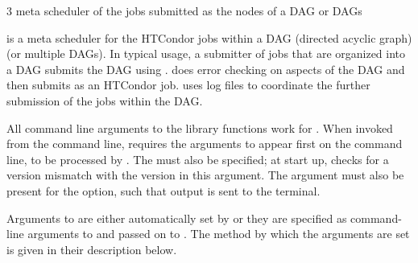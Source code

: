 \begin{ManPage}{\label{man-condor-dagman}}{3}
{meta scheduler of the jobs submitted as the nodes of a DAG or DAGs}
\Synopsis 
{}




\Description
{} is a meta scheduler for the HTCondor jobs within
a DAG (directed acyclic graph) (or multiple DAGs).
In typical usage,
a submitter of jobs that are organized into a DAG submits the
DAG using .
 does error checking on aspects of the DAG
and then submits  as an HTCondor job.
 uses log files to coordinate the further 
submission of the jobs within the DAG.

All command line arguments to the  library functions
work for .
When invoked from the command line,  requires
the arguments  to appear first on the command line,
to be processed by .
The  must also be specified;
at start up,
 checks for a version mismatch with the
 version in this argument.
The  argument must also be present for the 
option, such that output is sent to the terminal.

Arguments to  are either automatically set
by  
or they are specified as command-line arguments to 
and passed on to .
The method by which the arguments are set is
given in their description below.


\end{ManPage}
